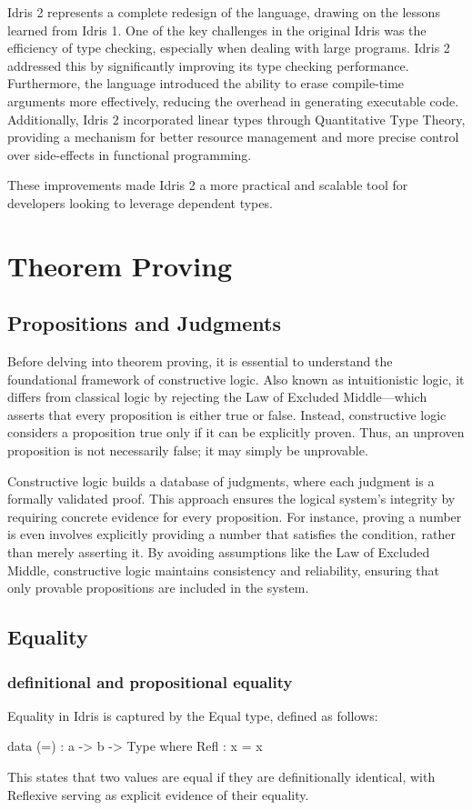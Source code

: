\documentclass[]{rptuseminar}
\begin{document}
Idris 2 represents a complete redesign of the language, drawing on the lessons learned from Idris 1. One of the key challenges in the original Idris was the efficiency of type checking, especially when dealing with large programs. Idris 2 addressed this by significantly improving its type checking performance. Furthermore, the language introduced the ability to erase compile-time arguments more effectively, reducing the overhead in generating executable code. Additionally, Idris 2 incorporated linear types through Quantitative Type Theory, providing a mechanism for better resource management and more precise control over side-effects in functional programming.

These improvements made Idris 2 a more practical and scalable tool for developers looking to leverage dependent types.
  

\section{Theorem Proving}
\label{sec:Propositions and judgments}
\subsection{Propositions and Judgments}
Before delving into theorem proving, it is essential to understand the foundational framework of constructive logic. Also known as intuitionistic logic, it differs from classical logic by rejecting the Law of Excluded Middle—which asserts that every proposition is either true or false. Instead, constructive logic considers a proposition true only if it can be explicitly proven. Thus, an unproven proposition is not necessarily false; it may simply be unprovable.

Constructive logic builds a database of judgments, where each judgment is a formally validated proof. This approach ensures the logical system’s integrity by requiring concrete evidence for every proposition. For instance, proving a number is even involves explicitly providing a number that satisfies the condition, rather than merely asserting it. By avoiding assumptions like the Law of Excluded Middle, constructive logic maintains consistency and reliability, ensuring that only provable propositions are included in the system.
\subsection{Equality}
\label{sec:Equality}
\subsubsection{definitional and propositional equality}
Equality in Idris is captured by the Equal type, defined as follows:
\begin{idris}
   data (=) : a -> b -> Type where  
   Refl : x = x
\end{idris}
This states that two values are equal if they are definitionally identical, with Reflexive serving as explicit evidence of their equality.
\end{document}

